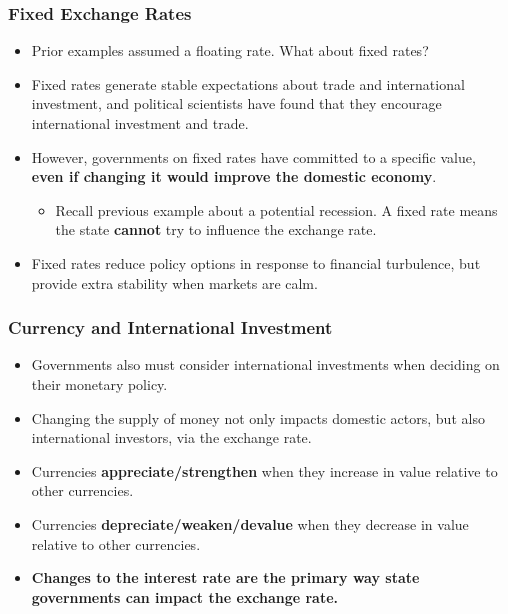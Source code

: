 \documentclass[handout]{beamer}
\begin{document}
\begin{frame} 
	\frametitle{\LARGE{Fixed Exchange Rates}}
	\begin{itemize}
		\item Prior examples assumed a floating rate. What about fixed rates? \pause
		\item Fixed rates generate stable expectations about trade and international investment, and political scientists have found that they encourage international investment and trade. \pause 
		\item However, governments on fixed rates have committed to a specific value, \textbf{even if changing it would improve the domestic economy}. \pause
		\begin{itemize}
			\item Recall previous example about a potential recession. A fixed rate means the state \textbf{cannot} try to influence the exchange rate. \pause
		\end{itemize}
		\item Fixed rates reduce policy options in response to financial turbulence, but provide extra stability when markets are calm.
	\end{itemize}
\end{frame}

\begin{frame} 
	\frametitle{\LARGE{Currency and International Investment}}
	\begin{itemize}
		\item Governments also must consider international investments when deciding on their monetary policy. \pause
		\item Changing the supply of money not only impacts domestic actors, but also international investors, via the exchange rate. \pause
		\item Currencies \textbf{appreciate/strengthen} when they increase in value relative to other currencies. \pause
		\item Currencies \textbf{depreciate/weaken/devalue} when they decrease in value relative to other currencies. \pause
		\item \textbf{Changes to the interest rate are the primary way state governments can impact the exchange rate.}		
	\end{itemize}
\end{frame}
\end{document}
